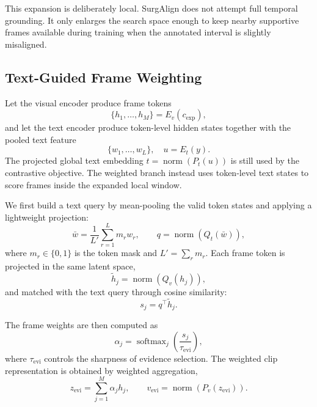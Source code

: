 This expansion is deliberately local. SurgAlign does not attempt full temporal grounding. It only enlarges the search space enough to keep nearby supportive frames available during training when the annotated interval is slightly misaligned.

\subsection{Text-Guided Frame Weighting}
\label{sec:method_selection}

Let the visual encoder produce frame tokens
\begin{equation}
\{h_1, \ldots, h_M\} = E_v(c_{\mathrm{exp}}),
\end{equation}
and let the text encoder produce token-level hidden states together with the pooled text feature
\begin{equation}
\{w_1, \ldots, w_L\}, \quad u = E_t(y).
\end{equation}
The projected global text embedding $t = \operatorname{norm}(P_t(u))$ is still used by the contrastive objective. The weighted branch instead uses token-level text states to score frames inside the expanded local window.

We first build a text query by mean-pooling the valid token states and applying a lightweight projection:
\begin{equation}
\bar{w} = \frac{1}{L'}\sum_{r=1}^{L} m_r w_r, \qquad
q = \operatorname{norm}(Q_t(\bar{w})),
\end{equation}
where $m_r \in \{0,1\}$ is the token mask and $L' = \sum_r m_r$. Each frame token is projected in the same latent space,
\begin{equation}
\tilde{h}_j = \operatorname{norm}(Q_v(h_j)),
\end{equation}
and matched with the text query through cosine similarity:
\begin{equation}
s_j = q^\top \tilde{h}_j.
\end{equation}

The frame weights are then computed as
\begin{equation}
\alpha_j = \operatorname{softmax}_{j}\left(\frac{s_j}{\tau_{\mathrm{evi}}}\right),
\end{equation}
where $\tau_{\mathrm{evi}}$ controls the sharpness of evidence selection. The weighted clip representation is obtained by weighted aggregation,
\begin{equation}
z_{\mathrm{evi}} = \sum_{j=1}^{M} \alpha_j h_j, \qquad
v_{\mathrm{evi}} = \operatorname{norm}(P_v(z_{\mathrm{evi}})).
\end{equation}

